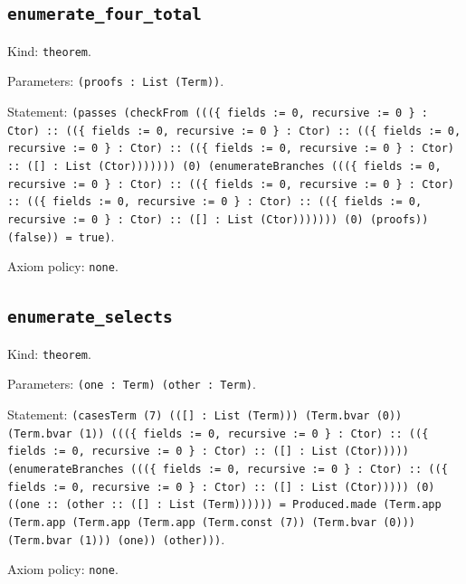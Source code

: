 \documentclass[11pt]{article}
\begin{document}
\subsection*{\texttt{enumerate\_four\_total}}
\noindent Kind: \texttt{theorem}.\par
\noindent Parameters: \texttt{(proofs : List (Term))}.\par
\noindent Statement: \texttt{(passes (checkFrom (((\{ fields := 0, recursive := 0 \} : Ctor) :: ((\{ fields := 0, recursive := 0 \} : Ctor) :: ((\{ fields := 0, recursive := 0 \} : Ctor) :: ((\{ fields := 0, recursive := 0 \} : Ctor) :: ([] : List (Ctor))))))) (0) (enumerateBranches (((\{ fields := 0, recursive := 0 \} : Ctor) :: ((\{ fields := 0, recursive := 0 \} : Ctor) :: ((\{ fields := 0, recursive := 0 \} : Ctor) :: ((\{ fields := 0, recursive := 0 \} : Ctor) :: ([] : List (Ctor))))))) (0) (proofs)) (false)) = true)}.\par
\noindent Axiom policy: \texttt{none}.\par
\subsection*{\texttt{enumerate\_selects}}
\noindent Kind: \texttt{theorem}.\par
\noindent Parameters: \texttt{(one : Term) (other : Term)}.\par
\noindent Statement: \texttt{(casesTerm (7) (([] : List (Term))) (Term.bvar (0)) (Term.bvar (1)) (((\{ fields := 0, recursive := 0 \} : Ctor) :: ((\{ fields := 0, recursive := 0 \} : Ctor) :: ([] : List (Ctor))))) (enumerateBranches (((\{ fields := 0, recursive := 0 \} : Ctor) :: ((\{ fields := 0, recursive := 0 \} : Ctor) :: ([] : List (Ctor))))) (0) ((one :: (other :: ([] : List (Term)))))) = Produced.made (Term.app (Term.app (Term.app (Term.app (Term.const (7)) (Term.bvar (0))) (Term.bvar (1))) (one)) (other)))}.\par
\noindent Axiom policy: \texttt{none}.\par
\end{document}
